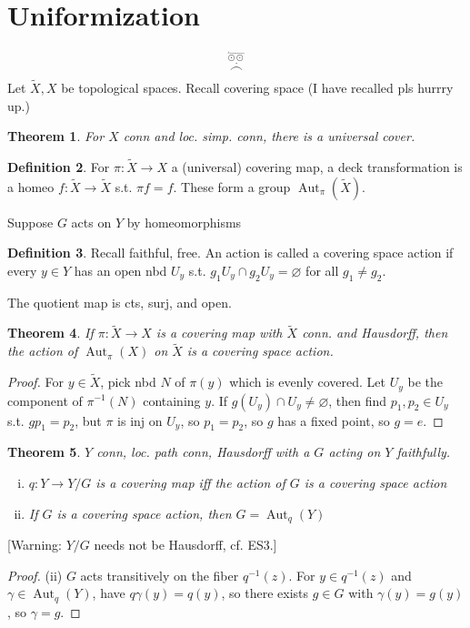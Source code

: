 \documentclass{article}
\theoremstyle{definition}
\newtheorem{defn}{Definition}[section]
\theoremstyle{remark}
\theoremstyle{plain}
\newtheorem{thm}[defn]{Theorem}
\begin{document}
\section{Uniformization}
\[\overset{\overset{\leftharpoonup}{\odot\odot}}{\overset{\cdot}{\frown}}\tag{Owen's signature}\]
Let $\tilde X,X$ be topological spaces. Recall covering space (I have recalled pls hurrry up.) 
\begin{thm}
    For $X$ conn and loc. simp. conn, there is a universal cover.
\end{thm}
\begin{defn}
    For $\pi:\tilde X\to X$ a (universal) covering map, a deck transformation is a homeo $f:\tilde X\to \tilde X$ s.t. $\pi f=f$. These form a group $\operatorname{Aut}_\pi(\tilde X)$.
\end{defn}
Suppose $G$ acts on $Y$ by homeomorphisms
\begin{defn}
    Recall faithful, free. An action is called a covering space action if every $y\in Y$ has an open nbd $U_y$ s.t. $g_1U_y\cap g_2U_y=\varnothing$ for all $g_1\neq g_2$.
\end{defn}
The quotient map is cts, surj, and open.
\begin{thm}
    If $\pi:\tilde X\to X$ is a covering map with $\tilde X$ conn. and Hausdorff, then the action of $\operatorname{Aut}_\pi(X)$ on $\tilde X$ is a covering space action.
\end{thm}
\begin{proof}
    For $y\in\tilde X$, pick nbd $N$ of $\pi(y)$ which is evenly covered. Let $U_y$ be the component of $\pi^{-1}(N)$ containing $y$. If $g(U_y)\cap U_y\neq\varnothing$, then find $p_1,p_2\in U_y$ s.t. $gp_1=p_2$, but $\pi$ is inj on $U_y$, so $p_1=p_2$, so $g$ has a fixed point, so $g=e$.
\end{proof} 
\begin{thm}
    $Y$ conn, loc. path conn, Hausdorff with a $G$ acting on $Y$ faithfully. 
    \begin{enumerate}[(i)]
        \item $q:Y\to Y/G$ is a covering map iff the action of $G$ is a covering space action
        \item If $G$ is a covering space action, then $G=\operatorname{Aut}_q(Y)$
    \end{enumerate}
\end{thm}
[Warning: $Y/G$ needs not be Hausdorff, cf. ES3.]
\begin{proof}
    (ii) $G$ acts transitively on the fiber $q^{-1}(z)$. For $y\in q^{-1}(z)$ and $\gamma\in\operatorname{Aut}_q(Y)$, have $q\gamma(y)=q(y)$, so there exists $g\in G$ with $\gamma(y)=g(y)$, so $\gamma=g$.
\end{proof}
\end{document}
